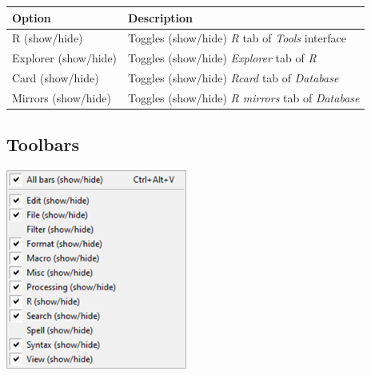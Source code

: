 \begin{scriptsize}
  \begin{tabularx}{\textwidth}{>{\hsize=0.3\hsize}X>{\hsize=0.7\hsize}X}\\
    \hline
    \textbf{Option} & \textbf{Description} \\
    \hline
    R (show/hide) & Toggles (show/hide) \textit{R} tab of \textit{Tools} interface \\
    \hdashline[1pt/1pt]
    Explorer (show/hide) & Toggles (show/hide) \textit{Explorer} tab of \textit{R} \\
    Card (show/hide) & Toggles (show/hide) \textit{Rcard} tab of \textit{Database} \\
    Mirrors (show/hide) & Toggles (show/hide) \textit{R mirrors} tab of \textit{Database} \\
    \hline
  \end{tabularx}
\end{scriptsize}


\hypertarget{menu_view_toolbars}{}
\subsection{Toolbars}

\includegraphics[scale=0.8]{./res/menu_view_toolsbar.png}\\


